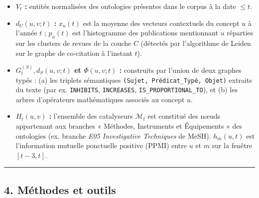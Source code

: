 \documentclass[a4paper,11pt]{article}
\providecommand{\tightlist}{\setlength{\itemsep}{0pt}\setlength{\parskip}{0pt}}
\begin{document}
\begin{itemize}
\tightlist
\item
  \textbf{\(V_t\) :} entités normalisées des ontologies présentes dans
  le corpus à la date \(\le t\).
\item
  \textbf{\(d_U(u,v;t)\) :} \(x_u(t)\) est la moyenne des vecteurs
  contextuels du concept \(u\) à l'année \(t\) ; \(p_u(t)\) est
  l'histogramme des publications mentionnant \(u\) réparties sur les
  clusters de revues de la couche \(C\) (détectés par l'algorithme de
  Leiden sur le graphe de co-citation à l'instant \(t\)).
\item
  \textbf{\(G^{(S)}_t, d_S(u,v;t)\) et \(\Phi(u,v;t)\) :} construits par
  l'union de deux graphes typés : (a) les triplets sémantiques
  \texttt{(Sujet,\ Prédicat\_Typé,\ Objet)} extraits du texte (par ex.
  \texttt{INHIBITS}, \texttt{INCREASES}, \texttt{IS\_PROPORTIONAL\_TO}),
  et (b) les arbres d'opérateurs mathématiques associés au concept
  \(u\).
\item
  \textbf{\(H_t(u,v)\) :} l'ensemble des catalyseurs \(\mathcal{M}_t\)
  est constitué des nœuds appartenant aux branches « Méthodes,
  Instruments et Équipements » des ontologies (ex. branche \emph{E05
  Investigative Techniques} de MeSH). \(h_m(u,t)\) est l'information
  mutuelle ponctuelle positive (PPMI) entre \(u\) et \(m\) sur la
  fenêtre \([t-3, t]\).
\end{itemize}

\begin{center}\rule{0.5\linewidth}{0.5pt}\end{center}

\subsection*{4. Méthodes et outils}
\end{document}
